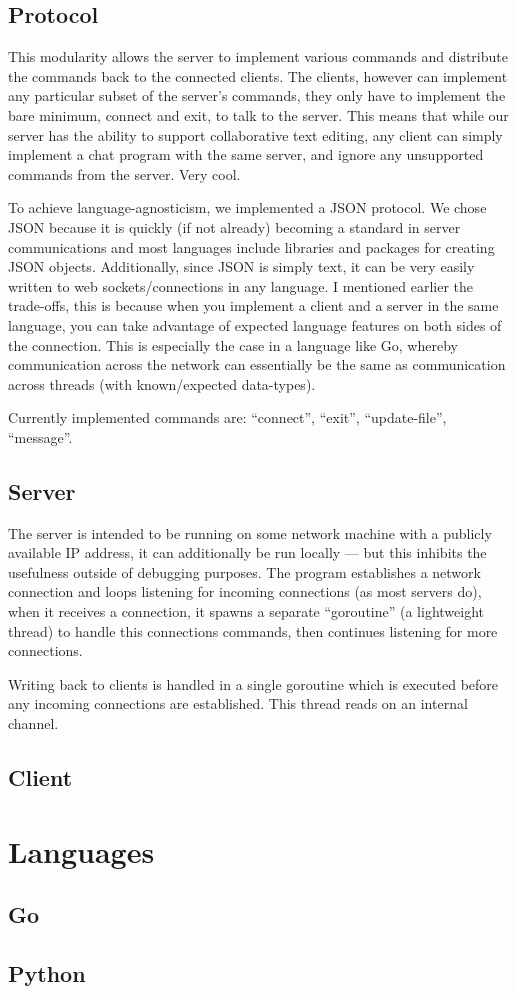 \documentclass[10pt, letterpaper]{article}
\begin{document}
\subsection*{Protocol}

This modularity allows the server to implement various commands and 
distribute the commands back to the connected clients. The clients, however 
can implement any particular subset of the server's commands, they only have 
to implement the bare minimum, connect and exit, to talk to the server. This 
means that while our server has the ability to support collaborative text 
editing, any client can simply implement a chat program with the same server, 
and ignore any unsupported commands from the server. Very cool.

To achieve language-agnosticism, we implemented a JSON protocol. We chose 
JSON because it is quickly (if not already) becoming a standard in server 
communications and most languages include libraries and packages for creating 
JSON objects. Additionally, since JSON is simply text, it can be very easily 
written to web sockets/connections in any language. I mentioned earlier the 
trade-offs, this is because when you implement a client and a server in the 
same language, you can take advantage of expected language features on both 
sides of the connection. This is especially the case in a language like Go, 
whereby communication across the network can essentially be the same as 
communication across threads (with known/expected data-types).

Currently implemented commands are: ``connect'', ``exit'', ``update-file'', 
``message''.

\subsection*{Server}

The server is intended to be running on some network machine with a publicly 
available IP address, it can additionally be run locally --- but this inhibits 
the usefulness outside of debugging purposes. The program establishes a 
network connection and loops listening for incoming connections (as most 
servers do), when it receives a connection, it spawns a separate ``goroutine'' 
(a lightweight thread) to handle this connections commands, then continues 
listening for more connections.

Writing back to clients is handled in a single goroutine which is executed 
before any incoming connections are established. This thread reads on an 
internal channel.

\subsection*{Client}

\section*{Languages}

\subsection*{Go}

\subsection*{Python}
\end{document}
